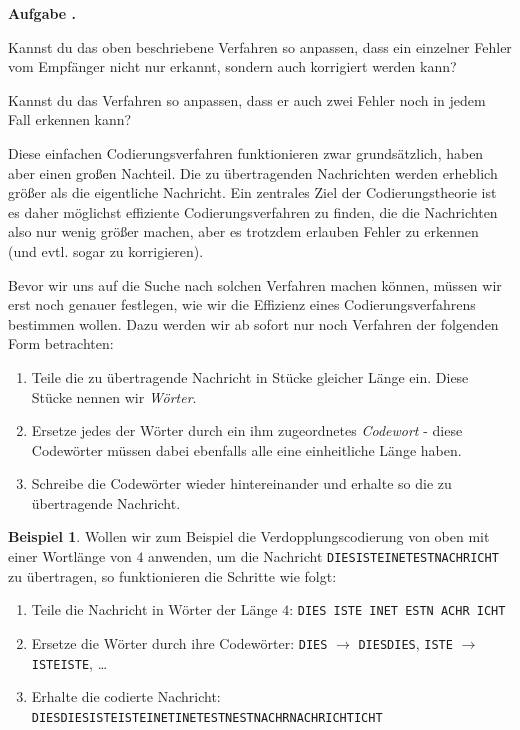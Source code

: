 \documentclass[a4paper,ngerman,12pt]{scrartcl}
\theoremstyle{definition}
\newtheorem{bsp}[defn]{Beispiel}
\theoremstyle{plain}
\theoremstyle{remark}
\newlength{\aufgabenskip}
\newcounter{aufgabennummer}
\newenvironment{aufgabe}[1]{
	\addtocounter{aufgabennummer}{1}
	\textbf{Aufgabe \theaufgabennummer.} \emph{#1} \par
}{\vspace{\aufgabenskip}}
\begin{document}
\begin{aufgabe}{}\label{aufgabe:verdreifachungsCodierung}
	Kannst du das oben beschriebene Verfahren so anpassen, dass ein einzelner Fehler vom Empfänger nicht nur erkannt, sondern auch korrigiert werden kann?
	
	Kannst du das Verfahren so anpassen, dass er auch zwei Fehler noch in jedem Fall erkennen kann?
\end{aufgabe}

Diese einfachen Codierungsverfahren funktionieren zwar grundsätzlich, haben aber einen großen Nachteil. Die zu übertragenden Nachrichten werden erheblich größer als die eigentliche Nachricht. Ein zentrales Ziel der Codierungstheorie ist es daher möglichst effiziente Codierungsverfahren zu finden, die die Nachrichten also nur wenig größer machen, aber es trotzdem erlauben Fehler zu erkennen (und evtl. sogar zu korrigieren).

Bevor wir uns auf die Suche nach solchen Verfahren machen können, müssen wir erst noch genauer festlegen, wie wir die Effizienz eines Codierungsverfahrens bestimmen wollen. Dazu werden wir ab sofort nur noch Verfahren der folgenden Form betrachten: 
\begin{enumerate}
	\item Teile die zu übertragende Nachricht in Stücke gleicher Länge ein. Diese Stücke nennen wir \emph{Wörter}. 
	\item Ersetze jedes der Wörter durch ein ihm zugeordnetes \emph{Codewort} - diese Codewörter müssen dabei ebenfalls alle eine einheitliche Länge haben.
	\item Schreibe die Codewörter wieder hintereinander und erhalte so die zu übertragende Nachricht.
\end{enumerate}

\begin{bsp}\label{bsp:Verdopplungscodierung}
	Wollen wir zum Beispiel die Verdopplungscodierung von oben mit einer Wortlänge von $4$ anwenden, um die Nachricht \texttt{DIESISTEINETESTNACHRICHT} zu übertragen, so funktionieren die Schritte wie folgt:
	\begin{enumerate}
		\item Teile die Nachricht in Wörter der Länge $4$: \texttt{DIES ISTE INET ESTN ACHR ICHT}
		\item Ersetze die Wörter durch ihre Codewörter: \texttt{DIES} $\rightarrow$ \texttt{DIESDIES}, \texttt{ISTE} $\rightarrow$ \texttt{ISTEISTE}, \dots
		\item Erhalte die codierte Nachricht: \texttt{DIESDIESISTEISTEINETINETESTNESTNACHRNACHRICHTICHT}
	\end{enumerate}
\end{bsp}
\end{document}
